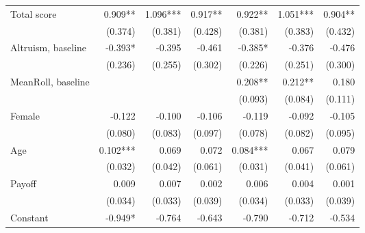 \begin{table}[htbp]
\begin{adjustbox}{width=1\textwidth}
\begin{threeparttable}
\begin{tabular}{l*{6}{D{.}{.}{-1}}}
Total score         &               0.909** &               1.096***&               0.917** &               0.922** &               1.051***&               0.904** \\
                    &             (0.374)   &             (0.381)   &             (0.428)   &             (0.381)   &             (0.383)   &             (0.432)   \\
Altruism, baseline  &              -0.393*  &              -0.395   &              -0.461   &              -0.385*  &              -0.376   &              -0.476   \\
                    &             (0.236)   &             (0.255)   &             (0.302)   &             (0.226)   &             (0.251)   &             (0.300)   \\
MeanRoll, baseline  &                       &                       &                       &               0.208** &               0.212** &               0.180   \\
                    &                       &                       &                       &             (0.093)   &             (0.084)   &             (0.111)   \\
Female              &              -0.122   &              -0.100   &              -0.106   &              -0.119   &              -0.092   &              -0.105   \\
                    &             (0.080)   &             (0.083)   &             (0.097)   &             (0.078)   &             (0.082)   &             (0.095)   \\
Age                 &               0.102***&               0.069   &               0.072   &               0.084***&               0.067   &               0.079   \\
                    &             (0.032)   &             (0.042)   &             (0.061)   &             (0.031)   &             (0.041)   &             (0.061)   \\
Payoff              &               0.009   &               0.007   &               0.002   &               0.006   &               0.004   &               0.001   \\
                    &             (0.034)   &             (0.033)   &             (0.039)   &             (0.034)   &             (0.033)   &             (0.039)   \\
Constant            &              -0.949*  &              -0.764   &              -0.643   &              -0.790   &              -0.712   &              -0.534   \\

\end{tabular}
\end{threeparttable}
\end{adjustbox}
\end{table}
